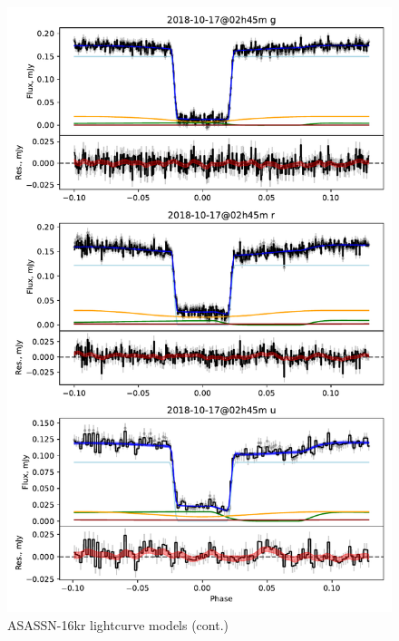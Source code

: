 \begin{figure}
    \centering
    \includegraphics[width=\textwidth]{figures/results/three_cvs_with_weird_colours/ASASSN-16kr/ASASSN-16kr_3.pdf}
    \caption{ASASSN-16kr lightcurve models (cont.)}
    \label{fig:ASASSN-16kr all lightcurves cont 2}
\end{figure}

